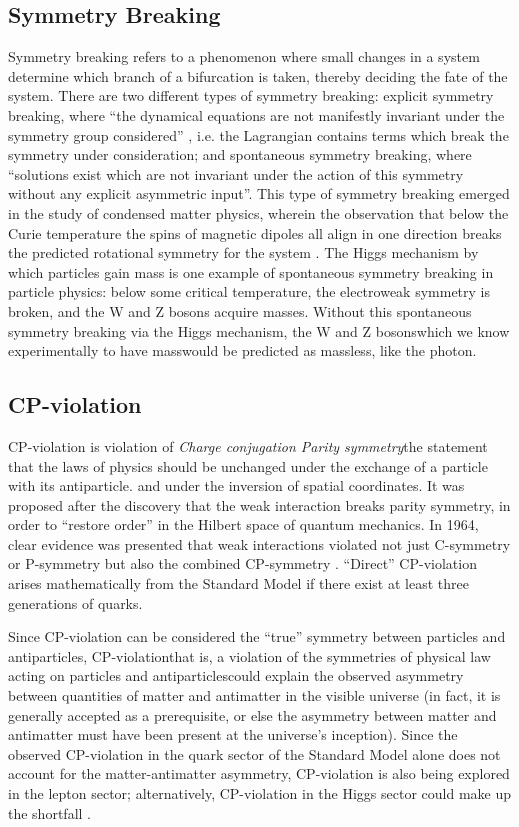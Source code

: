 \subsection{Symmetry Breaking}
Symmetry breaking refers to a phenomenon where small changes in a system determine which branch of a bifurcation is taken, thereby deciding the fate of the system. There are two different types of symmetry breaking: explicit symmetry breaking, where ``the dynamical equations are not manifestly invariant under the symmetry group considered'' \cite{Brading:2013:Symmetry}, i.e. the Lagrangian contains terms which break the symmetry under consideration; and spontaneous symmetry breaking, where “solutions exist which are not invariant under the action of this symmetry without any explicit asymmetric input”. This type of symmetry breaking emerged in the study of condensed matter physics, wherein the observation that below the Curie temperature the spins of magnetic dipoles all align in one direction breaks the predicted rotational symmetry for the system \cite{Brading:2013:Symmetry}. The Higgs mechanism by which particles gain mass is one example of spontaneous symmetry breaking in particle physics: below some critical temperature, the electroweak symmetry is broken, and the W and Z bosons acquire masses. Without this spontaneous symmetry breaking via the Higgs mechanism, the W and Z bosons\textemdash which we know experimentally to have mass\textemdash would be predicted as massless, like the photon. \cite{Fermi:Electroweak}

\subsection{CP-violation}
CP-violation is violation of \emph{Charge conjugation Parity symmetry}\textemdash the statement that the laws of physics should be unchanged under the exchange of a particle with its antiparticle. and under the inversion of spatial coordinates. It was proposed after the discovery that the weak interaction breaks parity symmetry, in order to ``restore order'' in the Hilbert space of quantum mechanics. In 1964, clear evidence was presented that weak interactions violated not just C-symmetry or P-symmetry but also the combined CP-symmetry \cite{CroninFitch:CP}. ``Direct'' CP-violation arises mathematically from the Standard Model if there exist at least three generations of quarks.

Since CP-violation can be considered the ``true'' symmetry between particles and antiparticles, CP-violation\textemdash that is, a violation of the symmetries of physical law acting on particles and antiparticles\textemdash could explain the observed asymmetry between quantities of matter and antimatter in the visible universe (in fact, it is generally accepted as a prerequisite, or else the asymmetry between matter and antimatter must have been present at the universe's inception). Since the observed CP-violation in the quark sector of the Standard Model alone does not account for the matter-antimatter asymmetry, CP-violation is also being explored in the lepton sector; alternatively, CP-violation in the Higgs sector could make up the shortfall \cite{LHC:CP:Higgs}.


